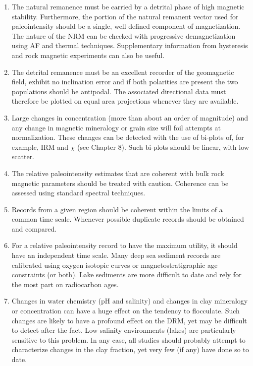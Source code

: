 \begin{enumerate}
\item The natural remanence must be carried by a detrital phase of high magnetic stability.
 Furthermore, the portion of the natural remanent
vector used for paleointensity should be  a single, well defined component of
magnetization.   The nature of the NRM can be checked with progressive demagnetization using AF and thermal techniques.  Supplementary information from hysteresis and rock magnetic experiments can also be useful. 

\item  The detrital remanence must be an excellent recorder of the geomagnetic field, exhibit no inclination error and if both polarities are present the two populations should be antipodal.   The associated directional data must therefore be plotted on equal area projections whenever they are available.   

\item Large changes in concentration (more than about an order of magnitude) and any change in    magnetic mineralogy  or  grain size will foil attempts at normalization.   These changes can be detected with the use of bi-plots of, for example, IRM and $\chi$ (see Chapter 8).  Such bi-plots should be linear, with low scatter.


\item The relative paleointensity estimates that are coherent with bulk rock
magnetic parameters should be treated with caution.  Coherence can be assessed using standard spectral techniques.  

\item  Records from a given region should be coherent within the limits of a common time
scale.   Whenever possible duplicate records should be obtained and compared. 

\item For a relative paleointensity record to have the maximum utility, it should have an independent time scale.  Many deep sea sediment records are calibrated using oxygen isotopic curves or magnetostratigraphic age constraints (or both).  Lake sediments are more difficult to date and rely for the most part on radiocarbon ages.  

\item Changes in water chemistry (pH and salinity) and changes in clay mineralogy or concentration can have a huge effect on the tendency to flocculate.  Such changes are likely to have a profound effect on the DRM, yet may be difficult to detect after the fact.  Low salinity environments (lakes) are particularly sensitive to this problem.    In any case, all studies should probably attempt to characterize changes in the clay fraction, yet very few (if any) have done so to date.  
\end{enumerate}

